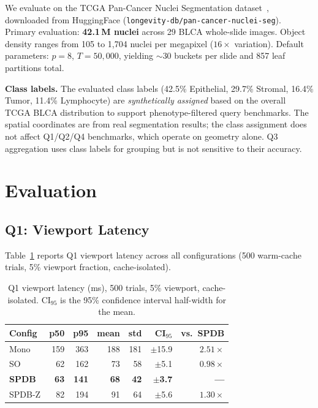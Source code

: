 \documentclass[sigconf]{acmart}
\begin{document}
We evaluate on the TCGA Pan-Cancer Nuclei Segmentation dataset~\cite{saltz2018spatial}, downloaded from HuggingFace (\texttt{longevity-db/pan-cancer-nuclei-seg}).
Primary evaluation: \textbf{42.1\,M nuclei} across 29 BLCA whole-slide images.
Object density ranges from 105 to 1{,}704 nuclei per megapixel ($16\times$ variation).
Default parameters: $p = 8$, $T = 50{,}000$, yielding $\sim$30 buckets per slide and 857 leaf partitions total.

\textbf{Class labels.}
The evaluated class labels (42.5\% Epithelial, 29.7\% Stromal, 16.4\% Tumor, 11.4\% Lymphocyte) are \emph{synthetically assigned} based on the overall TCGA BLCA distribution to support phenotype-filtered query benchmarks.
The spatial coordinates are from real segmentation results; the class assignment does not affect Q1/Q2/Q4 benchmarks, which operate on geometry alone.
Q3 aggregation uses class labels for grouping but is not sensitive to their accuracy.

\section{Evaluation}
\label{sec:evaluation}

\subsection{Q1: Viewport Latency}
\label{sec:q1}

Table~\ref{tab:q1_master} reports Q1 viewport latency across all configurations (500 warm-cache trials, 5\% viewport fraction, cache-isolated).

\begin{table}[t]
\centering
\caption{Q1 viewport latency (ms), 500 trials, 5\% viewport, cache-isolated.
CI$_{95}$ is the 95\% confidence interval half-width for the mean.}
\label{tab:q1_master}
\scriptsize
\begin{tabular}{@{}lrrrrrr@{}}
\toprule
\textbf{Config} & \textbf{p50} & \textbf{p95} & \textbf{mean} & \textbf{std} & \textbf{CI$_{95}$} & \textbf{vs.\ SPDB} \\
\midrule
Mono & 159 & 363 & 188 & 181 & $\pm$15.9 & $2.51\times$ \\
SO & 62 & 162 & 73 & 58 & $\pm$5.1 & $0.98\times$ \\
\textbf{SPDB} & \textbf{63} & \textbf{141} & \textbf{68} & \textbf{42} & $\pm$\textbf{3.7} & \textbf{---} \\
SPDB-Z & 82 & 194 & 91 & 64 & $\pm$5.6 & $1.30\times$ \\
\bottomrule
\end{tabular}
\end{table}
\end{document}
